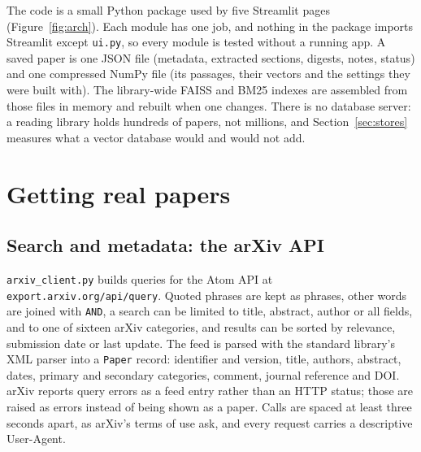 \documentclass[11pt,a4paper]{article}
\newcommand{\code}[1]{\texttt{#1}}
\begin{document}
The code is a small Python package used by five Streamlit pages (Figure~\ref{fig:arch}). Each module has one
job, and nothing in the package imports Streamlit except \code{ui.py}, so every module is tested without a
running app. A saved paper is one JSON file (metadata, extracted sections, digests, notes, status) and one
compressed NumPy file (its passages, their vectors and the settings they were built with). The library-wide
FAISS and BM25 indexes are assembled from those files in memory and rebuilt when one changes. There is no
database server: a reading library holds hundreds of papers, not millions, and
Section~\ref{sec:stores} measures what a vector database would and would not add.

\section{Getting real papers}

\subsection{Search and metadata: the arXiv API}
\code{arxiv\_client.py} builds queries for the Atom API at \code{export.arxiv.org/api/query}. Quoted phrases
are kept as phrases, other words are joined with \code{AND}, a search can be limited to title, abstract,
author or all fields, and to one of sixteen arXiv categories, and results can be sorted by relevance,
submission date or last update. The feed is parsed with the standard library's XML parser into a
\code{Paper} record: identifier and version, title, authors, abstract, dates, primary and secondary
categories, comment, journal reference and DOI. arXiv reports query errors as a feed entry rather than an
HTTP status; those are raised as errors instead of being shown as a paper. Calls are spaced at least three
seconds apart, as arXiv's terms of use ask, and every request carries a descriptive User-Agent.
\end{document}
